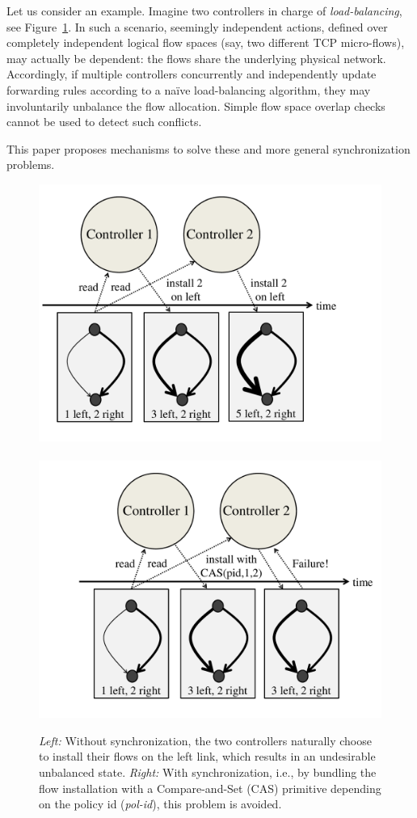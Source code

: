 \documentclass[conference]{sigcomm-alternate}
\newcommand{\pid}{\textit{pol-id}\xspace}
\begin{document}
Let us consider an example.
Imagine two controllers
in charge
of \emph{load-balancing}, see Figure~\ref{fig:CAS-example}.
In such a scenario, seemingly independent actions, defined over
completely independent logical flow spaces (say, two different
TCP micro-flows),
may actually be dependent: the flows share the underlying physical network.
Accordingly, if multiple controllers concurrently and independently
update forwarding rules according to a na\"ive load-balancing algorithm,
they may involuntarily
unbalance the flow allocation.
Simple flow space overlap checks cannot be used to detect
such conflicts.


This paper proposes mechanisms to solve these and more general 
synchronization problems.


\begin{figure}[t]
\centering
\includegraphics[width=.56\columnwidth]{loadbal-1.pdf}~\hspace{-.7cm}~\includegraphics[width=.56\columnwidth]{loadbal-2.pdf}\\
\caption{\small \emph{Left:} Without synchronization, the two controllers naturally choose to
install their flows on the left link, which results in an undesirable
unbalanced state.
 \emph{Right:}
 With synchronization, i.e., by bundling the flow installation with a Compare-and-Set (CAS) primitive
 depending on the policy id (\emph{\pid}), this problem is avoided.}\label{fig:CAS-example}
\end{figure}
\end{document}
